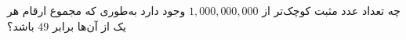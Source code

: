 \EXERCISE
چه تعداد عدد مثبت کوچک‌تر از
$1,000,000,000$
وجود دارد به‌طوری که مجموع ارقام هر یک از آن‌ها برابر
$49$
باشد؟